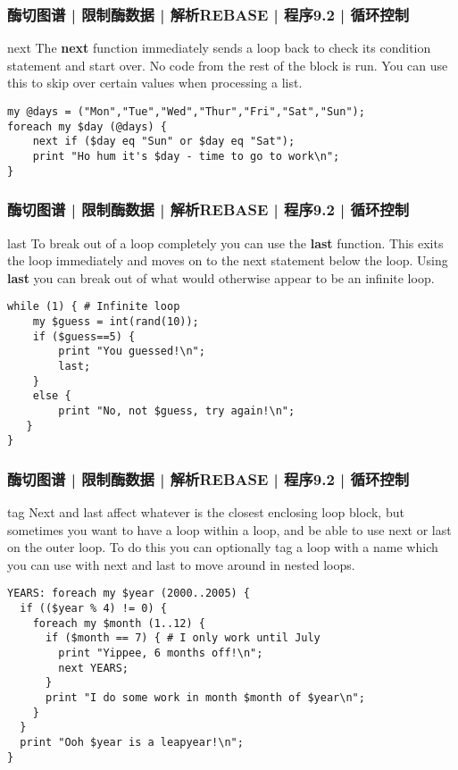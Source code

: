\begin{frame}[fragile]
  \frametitle{酶切图谱 | 限制酶数据 | 解析REBASE | 程序9.2 | 循环控制}
  \begin{block}{next}
    The \textbf{next} function immediately sends a loop back to check its condition statement and start over. No code from the rest of the block is run. You can use this to skip over certain values when processing a list.
  \end{block}
  \pause
\begin{lstlisting}
my @days = ("Mon","Tue","Wed","Thur","Fri","Sat","Sun");
foreach my $day (@days) {
    next if ($day eq "Sun" or $day eq "Sat");
    print "Ho hum it's $day - time to go to work\n";
}
\end{lstlisting}
\end{frame}

\begin{frame}[fragile]
  \frametitle{酶切图谱 | 限制酶数据 | 解析REBASE | 程序9.2 | 循环控制}
  \begin{block}{last}
    {\small To break out of a loop completely you can use the \textbf{last} function. This exits the loop immediately and moves on to the next statement below the loop. Using \textbf{last} you can break out of what would otherwise appear to be an infinite loop.}
  \end{block}
  \vspace{-0.5em}
  \pause
\begin{lstlisting}
while (1) { # Infinite loop
    my $guess = int(rand(10));
    if ($guess==5) {
        print "You guessed!\n";
        last;
    }
    else {
        print "No, not $guess, try again!\n";
   }
}
\end{lstlisting}
\end{frame}

\begin{frame}[fragile]
  \frametitle{酶切图谱 | 限制酶数据 | 解析REBASE | 程序9.2 | 循环控制}
  \begin{block}{tag}
    {\footnotesize Next and last affect whatever is the closest enclosing loop block, but sometimes you want to have a loop within a loop, and be able to use next or last on the outer loop. To do this you can optionally tag a loop with a name which you can use with next and last to move around in nested loops.}
  \end{block}
  \vspace{-1em}
  \pause
\begin{lstlisting}[basicstyle=\footnotesize\tt,numberstyle=\scriptsize]
YEARS: foreach my $year (2000..2005) {
  if (($year % 4) != 0) {
    foreach my $month (1..12) {
      if ($month == 7) { # I only work until July
        print "Yippee, 6 months off!\n";
        next YEARS;
      }
      print "I do some work in month $month of $year\n";
    }
  }
  print "Ooh $year is a leapyear!\n";
}
\end{lstlisting}
\end{frame}

